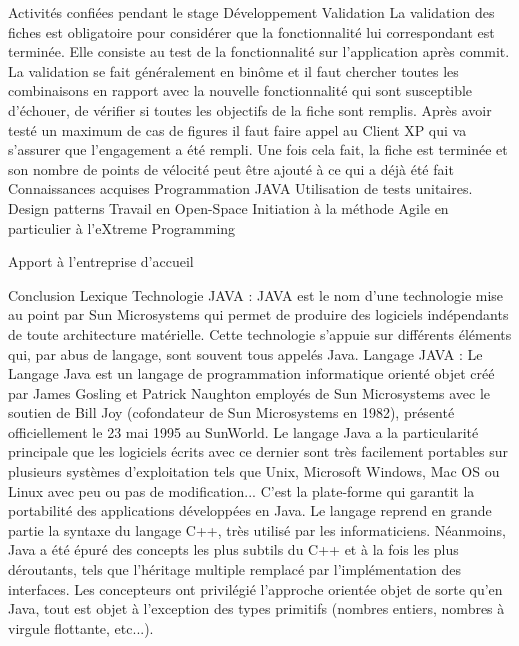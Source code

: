 \documentclass{article}
\begin{document}
Activités confiées pendant le stage
Développement
Validation
La validation des fiches est obligatoire pour considérer que la fonctionnalité lui correspondant est terminée. Elle consiste au test de la fonctionnalité sur l'application après commit. La validation se fait généralement en binôme et il faut chercher toutes les combinaisons en rapport avec la nouvelle fonctionnalité qui sont susceptible d'échouer, de vérifier si toutes les objectifs de la fiche sont remplis. Après avoir testé un maximum de cas de figures il faut faire appel au Client XP qui va s'assurer que l'engagement a été rempli. Une fois cela fait, la fiche est terminée et son nombre de points de vélocité peut être ajouté à ce qui a déjà été fait
Connaissances acquises
Programmation JAVA
Utilisation de tests unitaires.
Design patterns
Travail en Open-Space
Initiation à la méthode Agile en particulier à l'eXtreme Programming


Apport à l'entreprise d'accueil


Conclusion
Lexique
Technologie JAVA : JAVA est le nom d'une technologie mise au point par Sun Microsystems qui permet de produire des logiciels indépendants de toute architecture matérielle. Cette technologie s'appuie sur différents éléments qui, par abus de langage, sont souvent tous appelés Java.
Langage JAVA : Le Langage Java est un langage de programmation informatique orienté objet créé par James Gosling et Patrick Naughton employés de Sun Microsystems avec le soutien de Bill Joy (cofondateur de Sun Microsystems en 1982), présenté officiellement le 23 mai 1995 au SunWorld. Le langage Java a la particularité principale que les logiciels écrits avec ce dernier sont très facilement portables sur plusieurs systèmes d'exploitation tels que Unix, Microsoft Windows, Mac OS ou Linux avec peu ou pas de modification... C'est la plate-forme qui garantit la portabilité des applications développées en Java. Le langage reprend en grande partie la syntaxe du langage C++, très utilisé par les informaticiens. Néanmoins, Java a été épuré des concepts les plus subtils du C++ et à la fois les plus déroutants, tels que l'héritage multiple remplacé par l'implémentation des interfaces. Les concepteurs ont privilégié l'approche orientée objet de sorte qu'en Java, tout est objet à l'exception des types primitifs (nombres entiers, nombres à virgule flottante, etc...).
\end{document}
